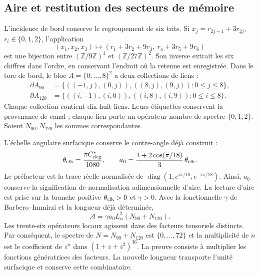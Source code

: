 \subsection{Aire et restitution des secteurs de mémoire}
\label{md:rigidez:area}

L’incidence de bord conserve le regroupement de six trits.
Si $x_j=r_{2j-1}+3r_{2j}$, $r_i\in\{0,1,2\}$, l’application
\[
 (x_1,x_2,x_3)\longmapsto
 (r_1+3r_2+9r_3,\ r_4+3r_5+9r_6)
\]
est une bijection entre $(\mathbb Z/9\mathbb Z)^3$ et
$(\mathbb Z/27\mathbb Z)^2$. Son inverse extrait les six chiffres dans l’ordre,
en conservant l’endroit où la retenue est enregistrée. Dans le tore de bord,
le bloc $A=\{0,\ldots,8\}^2$ a deux collections de liens :
\begin{align*}
 \partial A_{90}&=\{((-1,j),(0,j)),((8,j),(9,j)):0\le j\le8\},\\
 \partial A_{120}&=\{((i,-1),(i,0)),((i,8),(i,9)):0\le i\le8\}.
\end{align*}
Chaque collection contient dix-huit liens. Leurs étiquettes conservent la
provenance de canal ; chaque lien porte un opérateur nombre de spectre
$\{0,1,2\}$. Soient $N_{90},N_{120}$ les sommes correspondantes.

L’échelle angulaire surfacique conserve le contre-angle déjà construit :
\[
 \theta_{\rm clk}=\frac{\pi C^*_{\deg}}{1080},\qquad
 a_0=\frac{1+2\cos(\pi/18)}3\,\theta_{\rm clk}.
\]
Le préfacteur est la trace réelle normalisée de
$\operatorname{diag}(1,e^{i\pi/18},e^{-i\pi/18})$.
Ainsi, $a_0$ conserve la signification de normalisation adimensionnelle d’aire.
La lecture d’aire est prise sur la branche positive
$\theta_{\rm clk}>0$ et $\gamma>0$.
Avec la fonctionnelle $\gamma$ de Barbero--Immirzi et la longueur déjà déterminée,
\[
 \mathcal A=\gamma a_0L_\alpha^2(N_{90}+N_{120}).
\]
Les trente-six opérateurs locaux agissent dans des facteurs tensoriels
distincts. Par conséquent, le spectre de $N=N_{90}+N_{120}$ est
$\{0,\ldots,72\}$ et la multiplicité de $n$ est le coefficient de $z^n$
dans $(1+z+z^2)^{36}$. La preuve consiste à multiplier les fonctions
génératrices des facteurs. La nouvelle longueur transporte l’unité
surfacique et conserve cette combinatoire.

